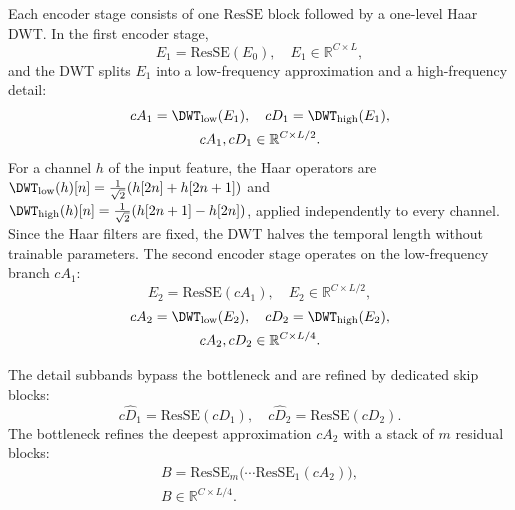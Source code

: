Each encoder stage consists of one $\mathrm{ResSE}$ block followed by a one-level Haar DWT. In the first encoder stage,
\begin{equation}
E_1 = \mathrm{ResSE}(E_0), \quad E_1 \in \mathbb{R}^{C \times L},
\end{equation}
and the DWT splits $E_1$ into a low-frequency approximation and a high-frequency detail:
\begin{equation}
\begin{gathered}
cA_1 = \DWT_{\mathrm{low}}(E_1), \quad cD_1 = \DWT_{\mathrm{high}}(E_1), \\
cA_1, cD_1 \in \mathbb{R}^{C \times L/2}.
\end{gathered}
\end{equation}
For a channel $h$ of the input feature, the Haar operators are $\DWT_{\mathrm{low}}(h)[n] = \frac{1}{\sqrt{2}}(h[2n] + h[2n+1])$ and $\DWT_{\mathrm{high}}(h)[n] = \frac{1}{\sqrt{2}}(h[2n+1] - h[2n])$, applied independently to every channel. Since the Haar filters are fixed, the DWT halves the temporal length without trainable parameters. The second encoder stage operates on the low-frequency branch $cA_1$:
\begin{equation}
E_2 = \mathrm{ResSE}(cA_1), \quad E_2 \in \mathbb{R}^{C \times L/2},
\end{equation}
\begin{equation}
\begin{gathered}
cA_2 = \DWT_{\mathrm{low}}(E_2), \quad cD_2 = \DWT_{\mathrm{high}}(E_2), \\
cA_2, cD_2 \in \mathbb{R}^{C \times L/4}.
\end{gathered}
\end{equation}

The detail subbands bypass the bottleneck and are refined by dedicated skip blocks:
\begin{equation}
c\hat{D}_1 = \mathrm{ResSE}(cD_1), \quad c\hat{D}_2 = \mathrm{ResSE}(cD_2).
\end{equation}
The bottleneck refines the deepest approximation $cA_2$ with a stack of $m$ residual blocks:
\begin{equation}
\begin{gathered}
B = \mathrm{ResSE}_m\big(\cdots \mathrm{ResSE}_1(cA_2)\big), \\
B \in \mathbb{R}^{C \times L/4}.
\end{gathered}
\end{equation}

